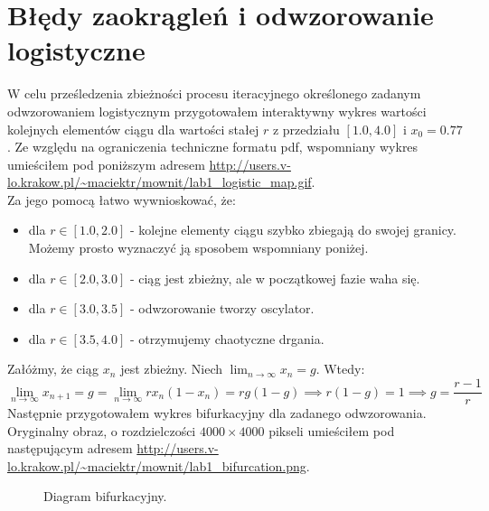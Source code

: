 \documentclass{article}
\begin{document}
    \section{Błędy zaokrągleń i odwzorowanie logistyczne}
        W celu prześledzenia zbieżności procesu iteracyjnego określonego zadanym odwzorowaniem logistycznym przygotowałem interaktywny wykres wartości kolejnych elementów ciągu dla wartości stałej $r$ z przedziału $[1.0, 4.0]$ i $x_0 = 0.77$. Ze względu na ograniczenia techniczne formatu pdf, wspomniany wykres umieściłem pod poniższym adresem \url{http://users.v-lo.krakow.pl/~maciektr/mownit/lab1_logistic_map.gif}.\\
        Za jego pomocą łatwo wywnioskować, że:
        \begin{itemize}
            \item dla $r\in[1.0,2.0]$ - kolejne elementy ciągu szybko zbiegają do swojej granicy. Możemy prosto wyznaczyć ją sposobem wspomniany poniżej.
            \item dla $r\in[2.0,3.0]$ - ciąg jest zbieżny, ale w początkowej fazie waha się. 
            \item dla $r\in[3.0,3.5]$ - odwzorowanie tworzy oscylator.
            \item dla $r\in[3.5,4.0]$ - otrzymujemy chaotyczne drgania. 
        \end{itemize}
        Załóżmy, że ciąg $x_n$ jest zbieżny. Niech $\lim_{n\to\infty} x_n=g$. Wtedy: 
        $$\lim_{n\to\infty} x_{n+1}=g=\lim_{n\to\infty} rx_n(1-x_n)=rg(1-g)\implies r(1-g)=1 \implies g=\frac{r-1}{r}$$
        Następnie przygotowałem wykres bifurkacyjny dla zadanego odwzorowania. Oryginalny obraz, o rozdzielczości $4000\times 4000$ pikseli umieściłem pod następującym adresem \url{http://users.v-lo.krakow.pl/~maciektr/mownit/lab1_bifurcation.png}.
        \begin{figure}[h!]
            \centering
            \caption{Diagram bifurkacyjny.}
        \end{figure}
\end{document}
